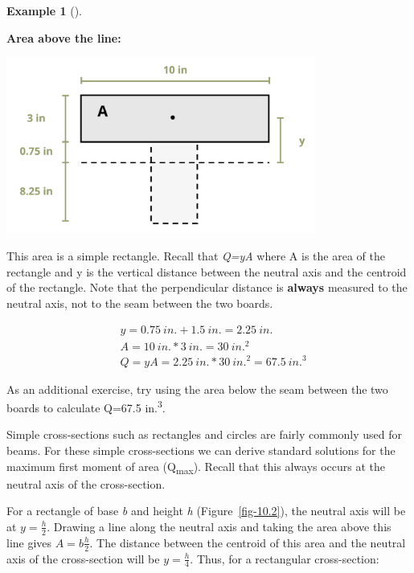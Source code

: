 \documentclass[
  letterpaper,
  DIV=11,
  numbers=noendperiod]{scrreprt}
\theoremstyle{definition}
\newtheorem{example}{Example}[chapter]
\theoremstyle{remark}
\begin{document}
\begin{tcolorbox}
\begin{example}[]
\begin{tcolorbox}
\textbf{Area above the line:}

\begin{center}
\includegraphics[width=4in,height=\textheight]{images/CH10 PNGs/example 10.2 part 2.png}
\end{center}

This area is a simple rectangle. Recall that \emph{Q=yA} where A is the
area of the rectangle and y is the vertical distance between the neutral
axis and the centroid of the rectangle. Note that the perpendicular
distance is \textbf{always} measured to the neutral axis, not to the
seam between the two boards.

\[
\begin{aligned}
& y=0.75{~in.}+1.5{~in.}=2.25{~in.} \\
& A=10{~in.} * 3{~in.}=30{~in.}^2 \\
& Q=y A=2.25{~in.} * 30{~in.}^2=67.5{~in.}^3
\end{aligned}
\]

As an additional exercise, try using the area below the seam between the
two boards to calculate Q=67.5 in.\textsuperscript{3}.

\end{tcolorbox}

\end{example}

\end{tcolorbox}

Simple cross-sections such as rectangles and circles are fairly commonly
used for beams. For these simple cross-sections we can derive standard
solutions for the maximum first moment of area (Q\textsubscript{max}).
Recall that this always occurs at the neutral axis of the cross-section.

For a rectangle of base \emph{b} and height \emph{h}
(Figure~\ref{fig-10.2}), the neutral axis will be at \(y=\frac{h}{2}\).
Drawing a line along the neutral axis and taking the area above this
line gives \(A=b \frac{h}{2}\). The distance between the centroid of
this area and the neutral axis of the cross-section will be
\(y=\frac{h}{4}\). Thus, for a rectangular cross-section:
\end{document}
